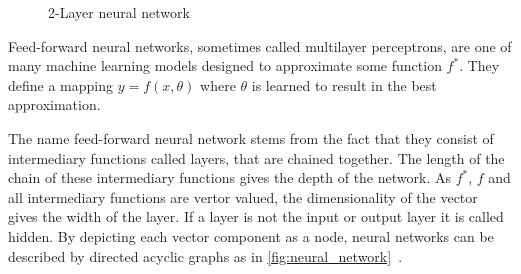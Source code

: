 \begin{figure}[htb!]
    \def\layersep{2.5cm}
    \centering
    \caption{2-Layer neural network}
    \label{fig:neural_network}
\end{figure}

Feed-forward neural networks, sometimes called multilayer perceptrons, are one
of many machine learning models designed to approximate some function $f^*$.
They define a mapping $y=f(x,\theta)$ where $\theta$ is learned to result in
the best approximation.

The name feed-forward neural network stems from the
fact that they consist of intermediary functions called layers, that are
chained together. The length of the chain of these intermediary functions gives
the depth of the network. As $f^*$, $f$ and all intermediary functions are
vertor valued, the dimensionality of the vector gives the width of the layer.
If a layer is not the input or output layer it is called hidden.
By depicting each vector component as a node, neural networks can be described
by directed acyclic graphs as in \autoref{fig:neural_network}~\cite{Goodfellow-et-al-2016}.

